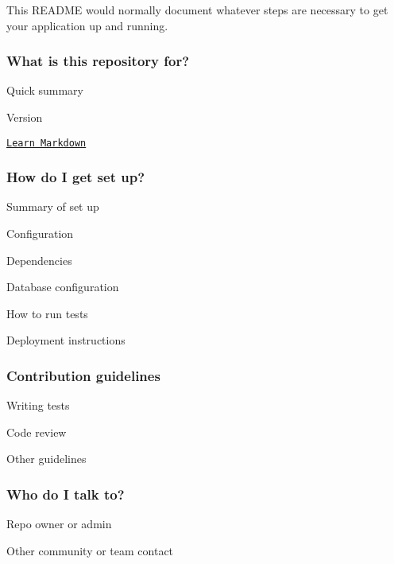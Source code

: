 This R\+E\+A\+D\+ME would normally document whatever steps are necessary to get your application up and running.

\subsubsection*{What is this repository for?}


\begin{DoxyItemize}
\item Quick summary
\item Version
\item \href{https://bitbucket.org/tutorials/markdowndemo}{\tt Learn Markdown}
\end{DoxyItemize}

\subsubsection*{How do I get set up?}


\begin{DoxyItemize}
\item Summary of set up
\item Configuration
\item Dependencies
\item Database configuration
\item How to run tests
\item Deployment instructions
\end{DoxyItemize}

\subsubsection*{Contribution guidelines}


\begin{DoxyItemize}
\item Writing tests
\item Code review
\item Other guidelines
\end{DoxyItemize}

\subsubsection*{Who do I talk to?}


\begin{DoxyItemize}
\item Repo owner or admin
\item Other community or team contact 
\end{DoxyItemize}